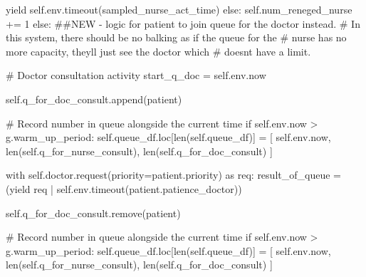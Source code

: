 \documentclass[
  letterpaper,
  DIV=11,
  numbers=noendperiod]{scrreprt}
\newenvironment{Shaded}{\begin{snugshade}}{\end{snugshade}}
\newcommand{\BuiltInTok}[1]{\textcolor[rgb]{0.00,0.23,0.31}{#1}}
\newcommand{\CommentTok}[1]{\textcolor[rgb]{0.37,0.37,0.37}{#1}}
\newcommand{\ControlFlowTok}[1]{\textcolor[rgb]{0.00,0.23,0.31}{#1}}
\newcommand{\DecValTok}[1]{\textcolor[rgb]{0.68,0.00,0.00}{#1}}
\newcommand{\ImportTok}[1]{\textcolor[rgb]{0.00,0.46,0.62}{#1}}
\newcommand{\NormalTok}[1]{\textcolor[rgb]{0.00,0.23,0.31}{#1}}
\newcommand{\OperatorTok}[1]{\textcolor[rgb]{0.37,0.37,0.37}{#1}}
\newcommand{\VariableTok}[1]{\textcolor[rgb]{0.07,0.07,0.07}{#1}}
\begin{document}
\begin{tcolorbox}
\begin{Shaded}
\begin{Highlighting}[]
                    \ControlFlowTok{yield} \VariableTok{self}\NormalTok{.env.timeout(sampled\_nurse\_act\_time)}
                \ControlFlowTok{else}\NormalTok{:}
                    \VariableTok{self}\NormalTok{.num\_reneged\_nurse }\OperatorTok{+=} \DecValTok{1}
        \ControlFlowTok{else}\NormalTok{:}
            \CommentTok{\#\#NEW {-} logic for patient to join queue for the doctor instead.}
            \CommentTok{\# In this system, there should be no balking as if the queue for the}
            \CommentTok{\# nurse has no more capacity, they\textquotesingle{}ll just see the doctor which}
            \CommentTok{\# doesn\textquotesingle{}t have a limit.}

            \CommentTok{\# Doctor consultation activity}
\NormalTok{            start\_q\_doc }\OperatorTok{=} \VariableTok{self}\NormalTok{.env.now}

            \VariableTok{self}\NormalTok{.q\_for\_doc\_consult.append(patient)}

            \CommentTok{\# Record number in queue alongside the current time}
            \ControlFlowTok{if} \VariableTok{self}\NormalTok{.env.now }\OperatorTok{\textgreater{}}\NormalTok{ g.warm\_up\_period:}
                \VariableTok{self}\NormalTok{.queue\_df.loc[}\BuiltInTok{len}\NormalTok{(}\VariableTok{self}\NormalTok{.queue\_df)] }\OperatorTok{=}\NormalTok{ [}
                    \VariableTok{self}\NormalTok{.env.now,}
                    \BuiltInTok{len}\NormalTok{(}\VariableTok{self}\NormalTok{.q\_for\_nurse\_consult),}
                    \BuiltInTok{len}\NormalTok{(}\VariableTok{self}\NormalTok{.q\_for\_doc\_consult)}
\NormalTok{                ]}

            \ControlFlowTok{with} \VariableTok{self}\NormalTok{.doctor.request(priority}\OperatorTok{=}\NormalTok{patient.priority) }\ImportTok{as}\NormalTok{ req:}
\NormalTok{                result\_of\_queue }\OperatorTok{=}\NormalTok{ (}\ControlFlowTok{yield}\NormalTok{ req }\OperatorTok{|}
                                \VariableTok{self}\NormalTok{.env.timeout(patient.patience\_doctor))}

                \VariableTok{self}\NormalTok{.q\_for\_doc\_consult.remove(patient)}

                \CommentTok{\# Record number in queue alongside the current time}
                \ControlFlowTok{if} \VariableTok{self}\NormalTok{.env.now }\OperatorTok{\textgreater{}}\NormalTok{ g.warm\_up\_period:}
                    \VariableTok{self}\NormalTok{.queue\_df.loc[}\BuiltInTok{len}\NormalTok{(}\VariableTok{self}\NormalTok{.queue\_df)] }\OperatorTok{=}\NormalTok{ [}
                        \VariableTok{self}\NormalTok{.env.now,}
                        \BuiltInTok{len}\NormalTok{(}\VariableTok{self}\NormalTok{.q\_for\_nurse\_consult),}
                        \BuiltInTok{len}\NormalTok{(}\VariableTok{self}\NormalTok{.q\_for\_doc\_consult)}
\NormalTok{                    ]}


\end{Highlighting}
\end{Shaded}
\end{tcolorbox}
\end{document}
